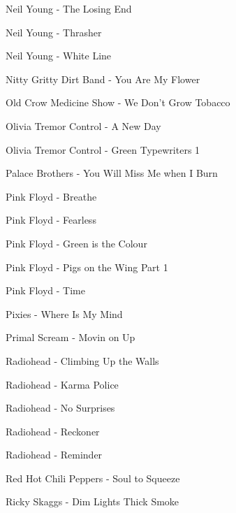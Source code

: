 Neil Young - The Losing End \dotfill \pageref{The Losing End - Neil Young} 

Neil Young - Thrasher \dotfill \pageref{Thrasher - Neil Young} 

Neil Young - White Line \dotfill \pageref{White Line - Neil Young} 

Nitty Gritty Dirt Band - You Are My Flower \dotfill \pageref{You Are My Flower - Nitty Gritty Dirt Band} 

Old Crow Medicine Show - We Don't Grow Tobacco \dotfill \pageref{We Don't Grow Tobacco - Old Crow Medicine Show} 

Olivia Tremor Control - A New Day \dotfill \pageref{A New Day - Olivia Tremor Control} 

Olivia Tremor Control - Green Typewriters 1 \dotfill \pageref{Green Typewriters 1 - Olivia Tremor Control} 

Palace Brothers - You Will Miss Me when I Burn \dotfill \pageref{You Will Miss Me when I Burn - Palace Brothers} 

Pink Floyd - Breathe \dotfill \pageref{Breathe - Pink Floyd} 

Pink Floyd - Fearless \dotfill \pageref{Fearless - Pink Floyd} 

Pink Floyd - Green is the Colour \dotfill \pageref{Green is the Colour - Pink Floyd} 

Pink Floyd - Pigs on the Wing Part 1 \dotfill \pageref{Pigs on the Wing Part 1 - Pink Floyd} 

Pink Floyd - Time \dotfill \pageref{Time - Pink Floyd} 

Pixies - Where Is My Mind \dotfill \pageref{Where Is My Mind - Pixies} 

Primal Scream - Movin on Up \dotfill \pageref{Movin on Up - Primal Scream} 

Radiohead - Climbing Up the Walls \dotfill \pageref{Climbing Up the Walls - Radiohead} 

Radiohead - Karma Police \dotfill \pageref{Karma Police - Radiohead} 

Radiohead - No Surprises \dotfill \pageref{No Surprises - Radiohead} 

Radiohead - Reckoner \dotfill \pageref{Reckoner - Radiohead} 

Radiohead - Reminder \dotfill \pageref{Reminder - Radiohead} 

Red Hot Chili Peppers - Soul to Squeeze \dotfill \pageref{Soul to Squeeze - Red Hot Chili Peppers} 

Ricky Skaggs - Dim Lights Thick Smoke \dotfill \pageref{Dim Lights Thick Smoke - Ricky Skaggs} 


